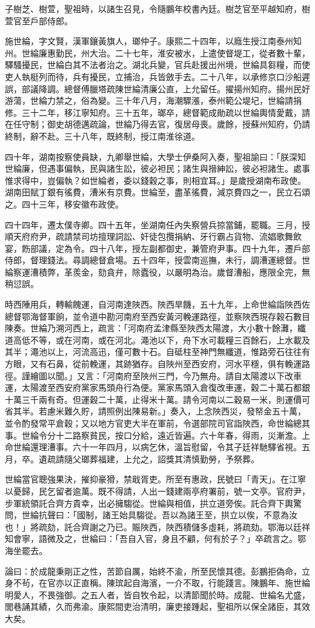 \begin{pinyinscope}
子樹芝、樹萱，聖祖時，以諸生召見，令隨鵬年校書內廷。樹芝官至平越知府，樹萱官至戶部侍郎。

施世綸，字文賢，漢軍鑲黃旗人，瑯仲子。康熙二十四年，以廕生授江南泰州知州。世綸廉惠勤民，州大治。二十七年，淮安被水，上遣使督堤工，從者數十輩，驛騷擾民，世綸白其不法者治之。湖北兵變，官兵赴援出州境，世綸具芻糧，而使吏人執梃列而待，兵有擾民，立捕治，兵皆斂手去。二十八年，以承修京口沙船遲誤，部議降調。總督傅臘塔疏陳世綸清廉公直，上允留任。擢揚州知府。揚州民好游蕩，世綸力禁之，俗為變。三十年八月，海潮驟漲，泰州範公堤圮，世綸請捐修。三十二年，移江寧知府。三十五年，瑯卒，總督範成勛疏以世綸輿情愛戴，請在任守制；御史胡德邁疏論，世綸乃得去官，復居母喪。歲餘，授蘇州知府，仍請終制，辭不赴。三十八年，既終制，授江南淮徐道。

四十年，湖南按察使員缺，九卿舉世綸，大學士伊桑阿入奏，聖祖諭曰：「朕深知世綸廉，但遇事偏執，民與諸生訟，彼必袒民；諸生與搢紳訟，彼必袒諸生。處事惟求得中，豈偏執？如世綸者，委以錢穀之事，則相宜耳。」是歲授湖南布政使。湖南田賦丁銀有徭費，漕米有京費。世綸至，盡革徭費，減京費四之一，民立石頌之。四十三年，移安徽布政使。

四十四年，遷太僕寺卿。四十五年，坐湖南任內失察營兵掠當鋪，罷職。三月，授順天府府尹，疏請禁司坊擅理詞訟、奸徒包攬捐納、牙行霸占貨物、流娼歌舞飲宴，飭部議，定為令。四十八年，授左副都御史，兼管府尹事。四十九年，遷戶部侍郎，督理錢法。尋調總督倉場。五十四年，授雲南巡撫，未行，調漕運總督。世綸察運漕積弊，革羨金，劾貪弁，除蠹役，以嚴明為治。歲督漕船，應限全完，無稍愆誤。

時西陲用兵，轉輸餽運，自河南達陜西。陜西旱饑，五十九年，上命世綸詣陜西佐總督鄂海督軍餉，並令道中勘河南府至西安黃河輓運路徑，並察陜西現存穀石數目陳奏。世綸乃溯河西上，疏言：「河南府孟津縣至陜西太陽渡，大小數十餘灘，纖道高低不等，或在河南，或在河北。澠池以下，舟下水可載糧三百餘石，上水載及其半；澠池以上，河流高迅，僅可數十石。自砥柱至神門無纖道，惟路旁石往往有方眼，又有石鼻，從前輓運，其跡猶存。自陜州至西安府，河水平穩，俱有輓運路徑。謹繪圖以聞。」又言：「河南府至陜州三門，今乃無舟。請自太陽渡以下改車運，太陽渡至西安府黨家馬頭舟行為便。黨家馬頭入倉復改車運，穀二十萬石都銀十萬三千兩有奇。但運穀二十萬，止得米十萬。請令河南以二穀易一米，則運價可省其半。若慮米難久貯，請照例出陳易新。」奏入，上念陜西災，發帑金五十萬，並令酌發常平倉穀；又以地方官吏大半在軍前，令選部院司官詣陜西，命世綸總其事。世綸令分十二路察貧民，按口分給，遠近皆遍。六十年春，得雨，災漸澹。上命世綸還理漕事。六十一年四月，以病乞休，溫旨慰留，令其子廷祥馳驛省視。五月，卒。遺疏請隨父瑯葬福建，上允之，詔獎其清慎勤勞，予祭葬。

世綸當官聰強果決，摧抑豪猾，禁戢胥吏。所至有惠政，民號曰「青天」。在江寧以憂歸，民乞留者逾萬。既不得請，人出一錢建兩亭府署前，號一文亭。官府尹，步軍統領託合齊方貴幸，出必擁騶從。世綸與相值，拱立道旁俟。託合齊下輿驚問，世綸抗聲曰：「國制，諸王始具騶從。吾以為諸王至，拱立以俟，不意為汝也！」將疏劾，託合齊謝之乃已。賑陜西，陜西積儲多虛耗，將疏劾。鄂海以廷祥知會寧，語微及之，世綸曰：「吾自入官，身且不顧，何有於子？」卒疏言之。鄂海坐罷去。

論曰：於成龍秉剛正之性，苦節自厲，始終不渝，所至民懷其德。彭鵬拒偽命，立身不茍，在官亦以正直稱。陳瑸起自海濱，一介不取，行能踐言。陳鵬年、施世綸明愛人，不畏強御。之五人者，皆自牧令起，以清節聞於時。成龍、世綸名尤盛，閭巷誦其績，久而弗渝。康熙間吏治清明，廉吏接踵起，聖祖所以保全諸臣，其效大矣。


\end{pinyinscope}